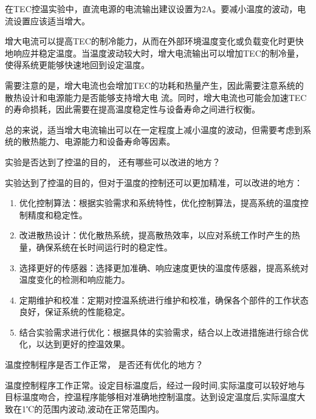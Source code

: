\documentclass[dvipsnames, svgnames,a4paper,11pt]{article}
\begin{document}
    在TEC控温实验中，直流电源的电流输出建议设置为2A。要减小温度的波动，电流设置应该适当增大。
    
    增大电流可以提高TEC的制冷能力，从而在外部环境温度变化或负载变化时更快地响应并稳定温度。当温度波动较大时，增大电流输出可以增加TEC的制冷量，使得系统更能够快速地回到设定温度。

    需要注意的是，增大电流也会增加TEC的功耗和热量产生，因此需要注意系统的散热设计和电源能力是否能够支持增大电
    流。同时，增大电流也可能会加速TEC的寿命损耗，因此需要在提高温度稳定性与设备寿命之间进行权衡。

    总的来说，适当增大电流输出可以在一定程度上减小温度的波动，但需要考虑到系统的散热能力、电源能力和设备寿命等因素。



    \begin{question}
        实验是否达到了控温的目的， 还有哪些可以改进的地方？
    \end{question}

    实验达到了控温的目的，但对于温度的控制还可以更加精准，可以改进的地方：

        \begin{enumerate}
            \item 优化控制算法：根据实验需求和系统特性，优化控制算法，提高系统的温度控制精度和稳定性。
            \item 改进散热设计：优化散热系统，提高散热效率，以应对系统工作时产生的热量，确保系统在长时间运行时的稳定性。
            \item 选择更好的传感器：选择更加准确、响应速度更快的温度传感器，提高系统对温度变化的检测和响应能力。
            \item 定期维护和校准：定期对控温系统进行维护和校准，确保各个部件的工作状态良好，保证系统的性能稳定。
            \item 结合实验需求进行优化：根据具体的实验需求，结合以上改进措施进行综合优化，以达到更好的控温效果。
        \end{enumerate}






    \begin{question}
        温度控制程序是否工作正常， 是否还有优化的地方？
    \end{question}

    温度控制程序工作正常。设定目标温度后，经过一段时间,实际温度可以较好地与目标温度吻合，控温程序能够相对准确地控制温度。达到设定温度后,实际温度大致在1℃的范围内波动,波动在正常范围内。
\end{document}
